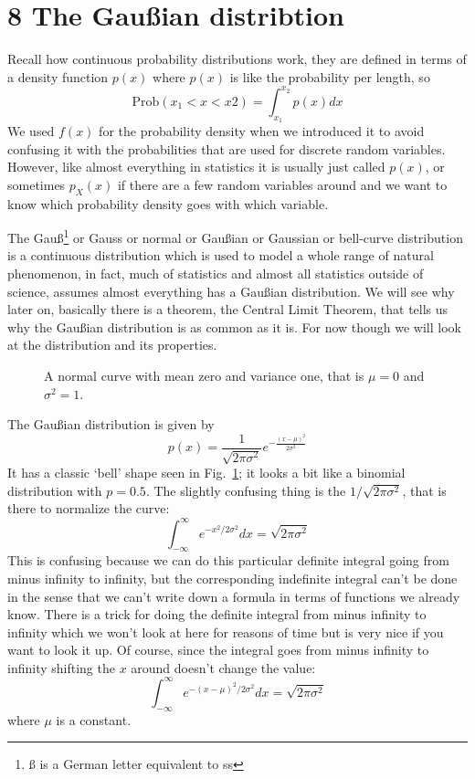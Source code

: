 \documentclass[11pt,a4paper]{scrartcl}
\begin{document}
\section*{8 The Gau\ss{}ian distribtion}

Recall how continuous probability distributions work, they are defined
in terms of a density function $p(x)$ where $p(x)$ is like the
probability per length, so 
\begin{equation}
\mbox{Prob}(x_1<x<x2)=\int_{x_1}^{x_2} p(x)dx
\end{equation}
We used $f(x)$ for the probability density when we introduced it to
avoid confusing it with the probabilities that are used for discrete
random variables. However, like almost everything in statistics it is
usually just called $p(x)$, or sometimes $p_X(x)$ if there are a few
random variables around and we want to know which probability density
goes with which variable.

The Gau\ss\footnote{\ss{} is a German letter equivalent to ss} or Gauss
or normal or Gau\ss{}ian or Gaussian or bell-curve distribution is a
continuous distribution which is used to model a whole range of
natural phenomenon, in fact, much of statistics and almost all
statistics outside of science, assumes almost everything has a
Gau\ss{}ian distribution. We will see why later on, basically there is
a theorem, the Central Limit Theorem, that tells us why the
Gau\ss{}ian distribution is as common as it is. For now though we will
look at the distribution and its properties.

\begin{figure}[tb]
\begin{center}

\end{center}
\caption{A normal curve with mean zero and variance one, that is $\mu=0$ and $\sigma^2=1$.\label{fig_gauss}}
\end{figure}

The Gau\ss{}ian distribution is given by
\begin{equation}
p(x)=\frac{1}{\sqrt{2\pi\sigma^2}}e^{-\frac{(x-\mu)^2}{2\sigma^2}}
\end{equation}
It has a classic \lq{}bell\rq{} shape seen in Fig.~\ref{fig_gauss}; it
looks a bit like a binomial distribution with $p=0.5$. The slightly
confusing thing is the $1/\sqrt{2\pi\sigma^2}$, that is there to normalize the curve:
\begin{equation}
\int_{-\infty}^\infty e^{-x^2/2\sigma^2}dx=\sqrt{2\pi\sigma^2}
\end{equation}
This is confusing because we can do this particular definite integral
going from minus infinity to infinity, but the corresponding
indefinite integral can't be done in the sense that we can't write
down a formula in terms of functions we already know. There is a trick
for doing the definite integral from minus infinity to infinity which
we won't look at here for reasons of time but is very nice if you want
to look it up. Of course, since the integral goes from minus infinity
to infinity shifting the $x$ around doesn't change the value:
\begin{equation}
\int_{-\infty}^\infty e^{-(x-\mu)^2/2\sigma^2}dx=\sqrt{2\pi\sigma^2}
\end{equation}
where $\mu$ is a constant.
\end{document}
